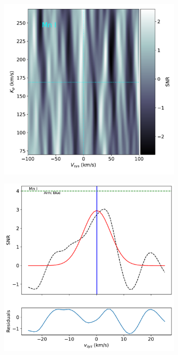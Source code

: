 \documentclass[twocolumn]{aastex631}
\begin{document}
\begin{figure}[ht!]
        \begin{subfigure}[b]{0.333\textwidth}
            \includegraphics[width=\textwidth]{plots-updated/kp-vsys-map/blue/KELT-20b.20190504.blue.Mn.CCFs-shifted.pdf}
            \label{fig:2d-ccf-Mn-combined}
        \end{subfigure}
        \begin{subfigure}[b]{0.333\textwidth}
            \includegraphics[width=\textwidth]{plots-updated/line-profile/blue/KELT-20b.20190504.blue.Mn.SNR-Gaussian.pdf}
            \label{fig:1d-ccf-Mn-combined}
        \end{subfigure}



\end{figure}
\end{document}

